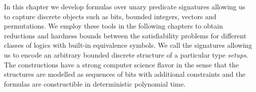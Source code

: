 In this chapter we develop formulas over unary predicate signatures allowing us
to capture discrete objects such as bits, bounded integers, vectors and
permutations.
We employ these tools in the following chapters to obtain reductions and
hardness bounds between the satisfiability problems for different classes of
logics with built-in equivalence symbols.
We call the signatures allowing us to encode an arbitrary bounded discrete
structure of a particular type \emph{setups}.
The constructions have a strong computer science flavor in the sense that the
structures are modelled as sequences of bits with additional constraints and the
formulas are constructible in deterministic polynomial time.
